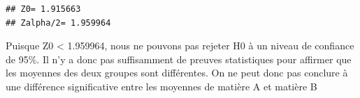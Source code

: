 \documentclass[
]{article}
\newenvironment{Shaded}{\begin{snugshade}}{\end{snugshade}}
\newcommand{\AttributeTok}[1]{\textcolor[rgb]{0.13,0.29,0.53}{#1}}
\newcommand{\CommentTok}[1]{\textcolor[rgb]{0.56,0.35,0.01}{\textit{#1}}}
\newcommand{\DecValTok}[1]{\textcolor[rgb]{0.00,0.00,0.81}{#1}}
\newcommand{\DocumentationTok}[1]{\textcolor[rgb]{0.56,0.35,0.01}{\textbf{\textit{#1}}}}
\newcommand{\FloatTok}[1]{\textcolor[rgb]{0.00,0.00,0.81}{#1}}
\newcommand{\FunctionTok}[1]{\textcolor[rgb]{0.13,0.29,0.53}{\textbf{#1}}}
\newcommand{\NormalTok}[1]{#1}
\newcommand{\OtherTok}[1]{\textcolor[rgb]{0.56,0.35,0.01}{#1}}
\newcommand{\SpecialCharTok}[1]{\textcolor[rgb]{0.81,0.36,0.00}{\textbf{#1}}}
\newcommand{\StringTok}[1]{\textcolor[rgb]{0.31,0.60,0.02}{#1}}
\begin{document}
\begin{Shaded}
\end{Shaded}

\begin{verbatim}
## Z0= 1.915663 
## Zalpha/2= 1.959964
\end{verbatim}

Puisque Z0 \textless{} 1.959964, nous ne pouvons pas rejeter H0 à un
niveau de confiance de 95\%. Il n'y a donc pas suffisamment de preuves
statistiques pour affirmer que les moyennes des deux groupes sont
différentes. On ne peut donc pas conclure à une différence significative
entre les moyennes de matière A et matière B
\end{document}

